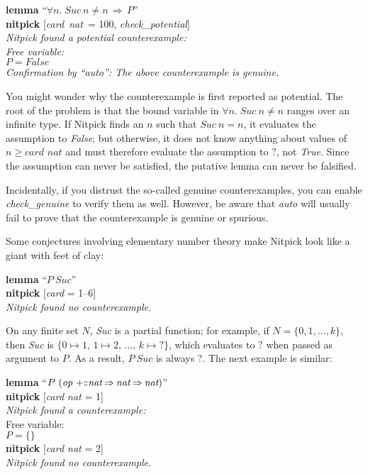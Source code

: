 \documentclass[a4paper,12pt]{article}
\def\Colon{\mathord{:\mkern-1.5mu:}}
\def\unk{{?}}
\begin{document}
\prew
\textbf{lemma} ``$\forall n.\; \textit{Suc}~n \mathbin{\not=} n \,\Longrightarrow\, P$'' \\
\textbf{nitpick} [\textit{card~nat}~= 100, \textit{check\_potential}] \\[2\smallskipamount]
\slshape Nitpick found a potential counterexample: \\[2\smallskipamount]
\hbox{}\qquad Free variable: \nopagebreak \\
\hbox{}\qquad\qquad $P = \textit{False}$ \\[2\smallskipamount]
Confirmation by ``\textit{auto}'': The above counterexample is genuine.
\postw

You might wonder why the counterexample is first reported as potential. The root
of the problem is that the bound variable in $\forall n.\; \textit{Suc}~n
\mathbin{\not=} n$ ranges over an infinite type. If Nitpick finds an $n$ such
that $\textit{Suc}~n \mathbin{=} n$, it evaluates the assumption to
\textit{False}; but otherwise, it does not know anything about values of $n \ge
\textit{card~nat}$ and must therefore evaluate the assumption to $\unk$, not
\textit{True}. Since the assumption can never be satisfied, the putative lemma
can never be falsified.

Incidentally, if you distrust the so-called genuine counterexamples, you can
enable \textit{check\_\allowbreak genuine} to verify them as well. However, be
aware that \textit{auto} will usually fail to prove that the counterexample is
genuine or spurious.

Some conjectures involving elementary number theory make Nitpick look like a
giant with feet of clay:

\prew
\textbf{lemma} ``$P~\textit{Suc}$'' \\
\textbf{nitpick} [\textit{card} = 1--6] \\[2\smallskipamount]
\slshape
Nitpick found no counterexample.
\postw

On any finite set $N$, \textit{Suc} is a partial function; for example, if $N =
\{0, 1, \ldots, k\}$, then \textit{Suc} is $\{0 \mapsto 1,\, 1 \mapsto 2,\,
\ldots,\, k \mapsto \unk\}$, which evaluates to $\unk$ when passed as
argument to $P$. As a result, $P~\textit{Suc}$ is always $\unk$. The next
example is similar:

\prew
\textbf{lemma} ``$P~(\textit{op}~{+}\Colon
\textit{nat}\mathbin{\Rightarrow}\textit{nat}\mathbin{\Rightarrow}\textit{nat})$'' \\
\textbf{nitpick} [\textit{card nat} = 1] \\[2\smallskipamount]
{\slshape Nitpick found a counterexample:} \\[2\smallskipamount]
\hbox{}\qquad Free variable: \nopagebreak \\
\hbox{}\qquad\qquad $P = \{\}$ \\[2\smallskipamount]
\textbf{nitpick} [\textit{card nat} = 2] \\[2\smallskipamount]
{\slshape Nitpick found no counterexample.}
\postw
\end{document}
